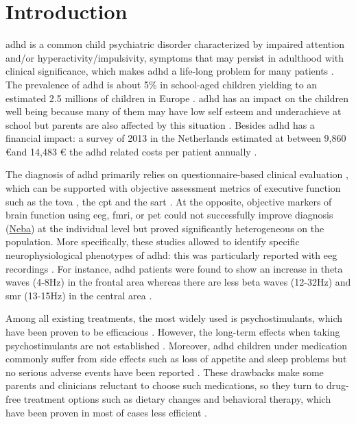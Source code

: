

\section{Introduction} 

\gls{adhd} is a common child psychiatric disorder characterized by impaired attention and/or hyperactivity/impulsivity, 
symptoms that may persist in adulthood with clinical significance, which makes \gls{adhd} a life-long problem for many patients 
\citep{Faraone2006}. The prevalence of \gls{adhd} is about 5\% in school-aged children yielding to an estimated 2.5 millions of 
children in Europe \citep{DSM-5}. \gls{adhd} has an impact on the children well being because many of them may have low self 
esteem \citep{Shaw2005} and underachieve at school \citep{Barry2002} but parents are also affected by this situation \citep{Harpin2005}.
Besides \gls{adhd} has a financial impact: a survey of 2013 in the Netherlands estimated at between 9,860 \euro and 14,483 \euro 
the \gls{adhd} related costs per patient annually \citep{le2014}. 
 
The diagnosis of \gls{adhd} primarily relies on questionnaire-based clinical evaluation \citep{DSM-5}, which can be supported 
with objective assessment metrics of executive function such as the \gls{tova} \citep{Forbes1998}, the \gls{cpt} \citep{Barkley1991} 
and the \gls{sart} \citep{Robertson1997}. At the opposite, objective markers of brain function using \gls{eeg}, \gls{fmri}, or \gls{pet}
could not successfully improve diagnosis (\href{https://shop.nebahealth.com/products/neba-fda-cleared-brainwave-adhd-assessment-aid}{Neba})
at the individual level but proved significantly heterogeneous on the population. More specifically, these studies allowed to identify 
specific neurophysiological phenotypes of \gls{adhd}: this was particularly reported with \gls{eeg} recordings \citep{loo2017}. 
For instance, \gls{adhd} patients were found to show an increase in theta waves (4-8Hz) in the frontal area whereas there are less 
beta waves (12-32Hz) and \gls{smr} (13-15Hz) in the central area \citep{Monastra2005, Matouvsek1984, Janzen1995}.  
 
Among all existing treatments, the most widely used is psychostimulants, which have been proven to be 
efficacious \citep{Taylor2014, Storebo2015}. However, the long-term effects when taking psychostimulants
are not established \citep{DuPaul1998, Swanson2001, Jensen1999}. Moreover, \gls{adhd} children under medication commonly suffer 
from side effects such as loss of appetite and sleep problems but no serious adverse events have been reported \citep{Storebo2015, Cooper2011}. 
These drawbacks make some parents and clinicians reluctant to choose such medications, so they turn to drug-free
treatment options such as dietary changes \citep{Belanger2009} and behavioral therapy, which have been proven in most of cases 
less efficient \citep{Sonuga-Barke2013}.

